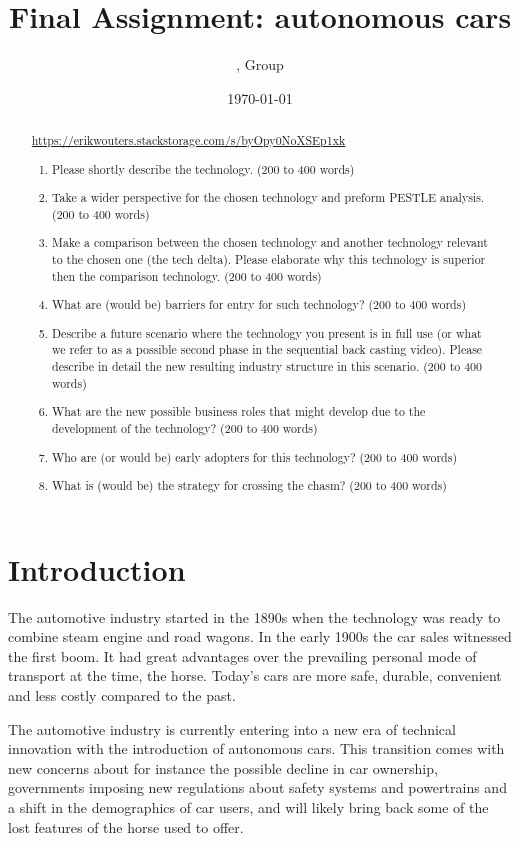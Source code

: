 \documentclass[a4paper]{article}
\title{Final Assignment: autonomous cars}
\author{\censor{Erik Wouters}, Group \censor{13}}
\date{\today}
\begin{document}
\maketitle

\begin{abstract}
\url{https://erikwouters.stackstorage.com/s/byOpy0NoXSEp1xk}
\begin{enumerate}
    \item Please shortly describe the technology. (200 to 400 words)
    \item Take a wider perspective for the chosen technology and preform PESTLE analysis. (200 to 400 words)
    \item Make a comparison between the chosen technology and another technology relevant to the chosen one (the tech delta). Please elaborate why this technology is superior then the comparison technology. (200 to 400 words)
    \item What are (would be) barriers for entry for such technology? (200 to 400 words)
    \item Describe a future scenario where the technology you present is in full use (or what we refer to as a possible second phase in the sequential back casting video). Please describe in detail the new resulting industry structure in this scenario. (200 to 400 words)
    \item What are the new possible business roles that might develop due to the development of the technology? (200 to 400 words)
    \item Who are (or would be) early adopters for this technology? (200 to 400 words)
    \item What is (would be) the strategy for crossing the chasm? (200 to 400 words)
\end{enumerate}
\end{abstract}

\section{Introduction}
\label{sec:introduction}

The automotive industry started in the 1890s when the technology was ready to combine steam engine and road wagons. In the early 1900s the car sales witnessed the first boom. It had great advantages over the prevailing personal mode of transport at the time, the horse. Today's cars are more safe, durable, convenient and less costly compared to the past.

The automotive industry is currently entering into a new era of technical innovation with the introduction of autonomous cars. This transition comes with new concerns about for instance the possible decline in car ownership, governments imposing new regulations about safety systems and powertrains and a shift in the demographics of car users, and will likely bring back some of the lost features of the horse used to offer.
\end{document}
